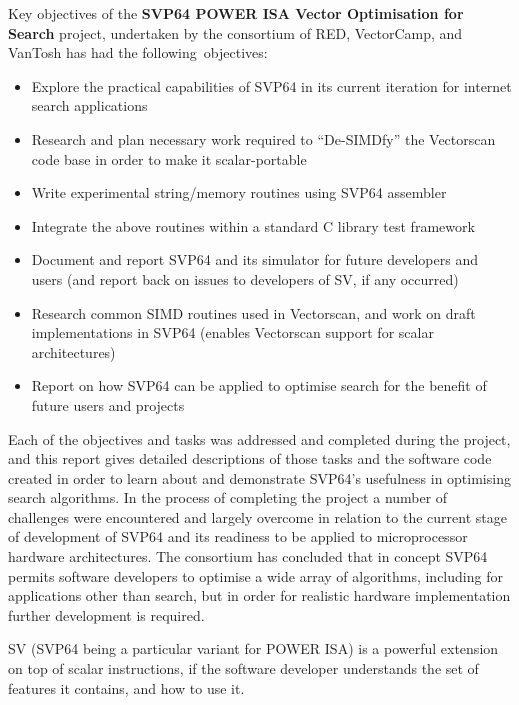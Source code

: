Key objectives of the
\textbf{\acrshort{SVP64} \acrshort{POWER} ISA Vector Optimisation for Search}
project, undertaken by the consortium of RED, VectorCamp, and VanTosh
has had the following objectives:

\begin{itemize}
  \item Explore the practical capabilities of \acrshort{SVP64} in its current
        iteration for internet search applications
  \item Research and plan necessary work required to “De-SIMDfy” the Vectorscan
        code base in order to make it scalar-portable
  \item Write experimental string/memory routines using \acrshort{SVP64}
        assembler
  \item Integrate the above routines within a standard C library test framework
  \item Document and report \acrshort{SVP64} and its simulator for future
        developers and users (and report back on issues to developers of
        \acrshort{SV}, if any occurred)
  \item Research common \acrshort{SIMD} routines used in Vectorscan, and work
        on draft implementations in \acrshort{SVP64}
        (enables Vectorscan support for scalar architectures)
  \item Report on how \acrshort{SVP64} can be applied to optimise search for
        the benefit of future users and projects
\end{itemize}

Each of the objectives and tasks was addressed and completed during the
project, and this report gives detailed descriptions of those tasks and the
software code created in order to learn about and demonstrate \acrshort{SVP64}’s
usefulness in optimising search algorithms.
In the process of completing the project a number of challenges were
encountered and largely overcome in relation to the current stage of
development of \acrshort{SVP64} and its readiness to be applied to microprocessor
hardware architectures.
The consortium has concluded that in concept \acrshort{SVP64} permits software developers
to optimise a wide array of algorithms, including for applications other
than search, but in order for realistic hardware implementation
further development is required.

\acrfull{SV} (\acrshort{SVP64} being a particular variant for \acrshort{POWER}
ISA) is a powerful extension on top of scalar instructions, if the software
developer understands the set of features it contains, and how to use it.

